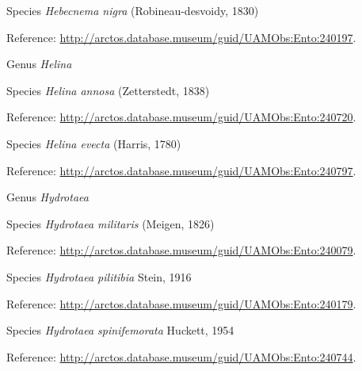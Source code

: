 \documentclass[9pt, article]{memoir}
\begin{document}
\begin{multicols}{2}
\vspace{6pt}\noindent\hspace{36pt}Species \textit{Hebecnema nigra} (Robineau-desvoidy, 1830)


\vspace{6pt}Reference: 
\url{http://arctos.database.museum/guid/UAMObs:Ento:240197}.

\vspace{6pt}\noindent\hspace{30pt}Genus \textit{Helina}


\vspace{6pt}\noindent\hspace{36pt}Species \textit{Helina annosa} (Zetterstedt, 1838)


\vspace{6pt}Reference: 
\url{http://arctos.database.museum/guid/UAMObs:Ento:240720}.

\vspace{6pt}\noindent\hspace{36pt}Species \textit{Helina evecta} (Harris, 1780)


\vspace{6pt}Reference: 
\url{http://arctos.database.museum/guid/UAMObs:Ento:240797}.

\vspace{6pt}\noindent\hspace{30pt}Genus \textit{Hydrotaea}


\vspace{6pt}\noindent\hspace{36pt}Species \textit{Hydrotaea militaris} (Meigen, 1826)


\vspace{6pt}Reference: 
\url{http://arctos.database.museum/guid/UAMObs:Ento:240079}.

\vspace{6pt}\noindent\hspace{36pt}Species \textit{Hydrotaea pilitibia} Stein, 1916


\vspace{6pt}Reference: 
\url{http://arctos.database.museum/guid/UAMObs:Ento:240179}.

\vspace{6pt}\noindent\hspace{36pt}Species \textit{Hydrotaea spinifemorata} Huckett, 1954


\vspace{6pt}Reference: 
\url{http://arctos.database.museum/guid/UAMObs:Ento:240744}.


\end{multicols}
\end{document}

